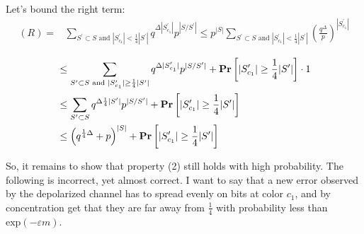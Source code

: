 \documentclass[manuscript,screen,review]{acmart}
\begin{document}
Let's bound the right term: 
\begin{equation*}
  \begin{split}
    (R) = & \sum_{S^{\prime} \subset S \text{ and }  |S^{\prime}_{c_1}| < \frac{1}{4} |S^{\prime}|}{q^{\Delta |S^{\prime}_{c_1}|}p^{|S /S^{\prime}|}  } \le p^{|S|}\sum_{S^{\prime} \subset S \text{ and }  |S^{\prime}_{c_1}| < \frac{1}{4} |S^{\prime}|}{ \left( \frac{q^{\Delta}}{p} \right)^{ |S^{\prime}_{c_1}|}  }
  \end{split}
\end{equation*}


\begin{equation*}
  \begin{split}
    & \le \sum_{S^{\prime} \subset S \text{ and }  |S^{\prime}_{c_1}| \ge \frac{1}{4} |S^{\prime}|}{q^{\Delta |S^{\prime}_{c_1}|}p^{|S /S^{\prime}|}  } + \mathbf{Pr} \left[  |S^{\prime}_{c_1}| \ge \frac{1}{4} |S^{\prime}| \right] \cdot 1 \\ 
    & \le \sum_{S^{\prime} \subset S }{q^{\Delta \frac{1}{4}|S^{\prime}|}p^{|S /S^{\prime}|}  } + \mathbf{Pr} \left[  |S^{\prime}_{c_1}| \ge \frac{1}{4} |S^{\prime}| \right] \\ 
    &\le \left( q^{\frac{1}{4}\Delta} + p \right)^{|S|}  + \mathbf{Pr} \left[  |S^{\prime}_{c_1}| \ge \frac{1}{4} |S^{\prime}| \right]  
  \end{split}
\end{equation*}
\newcommand*{\Pt}{\mathcal{P}}





So, it remains to show that property (2) still holds with high probability. The following is incorrect, yet almost correct. I want to say that a new error observed by the depolarized channel has to spread evenly on bits at color $c_{1}$, and by concentration get that they are far away from $\frac{1}{4}$ with probability less than $\text{exp}( - \varepsilon m )$.
\end{document}
